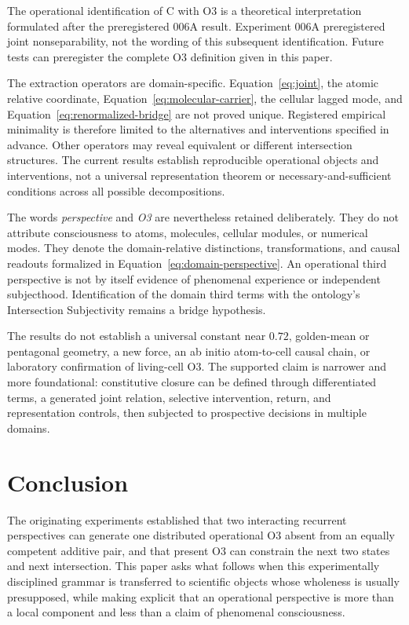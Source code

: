 \documentclass[11pt,a4paper]{article}
\begin{document}
The operational identification of C with O3 is a theoretical interpretation formulated after the preregistered 006A result. Experiment 006A preregistered joint nonseparability, not the wording of this subsequent identification. Future tests can preregister the complete O3 definition given in this paper.

The extraction operators are domain-specific. Equation~\eqref{eq:joint}, the atomic relative coordinate, Equation~\eqref{eq:molecular-carrier}, the cellular lagged mode, and Equation~\eqref{eq:renormalized-bridge} are not proved unique. Registered empirical minimality is therefore limited to the alternatives and interventions specified in advance. Other operators may reveal equivalent or different intersection structures. The current results establish reproducible operational objects and interventions, not a universal representation theorem or necessary-and-sufficient conditions across all possible decompositions.

The words \emph{perspective} and \emph{O3} are nevertheless retained deliberately. They do not attribute consciousness to atoms, molecules, cellular modules, or numerical modes. They denote the domain-relative distinctions, transformations, and causal readouts formalized in Equation~\eqref{eq:domain-perspective}. An operational third perspective is not by itself evidence of phenomenal experience or independent subjecthood. Identification of the domain third terms with the ontology's Intersection Subjectivity remains a bridge hypothesis.

The results do not establish a universal constant near $0.72$, golden-mean or pentagonal geometry, a new force, an ab initio atom-to-cell causal chain, or laboratory confirmation of living-cell O3. The supported claim is narrower and more foundational: constitutive closure can be defined through differentiated terms, a generated joint relation, selective intervention, return, and representation controls, then subjected to prospective decisions in multiple domains.

\section{Conclusion}

The originating experiments established that two interacting recurrent perspectives can generate one distributed operational O3 absent from an equally competent additive pair, and that present O3 can constrain the next two states and next intersection. This paper asks what follows when this experimentally disciplined grammar is transferred to scientific objects whose wholeness is usually presupposed, while making explicit that an operational perspective is more than a local component and less than a claim of phenomenal consciousness.
\end{document}
